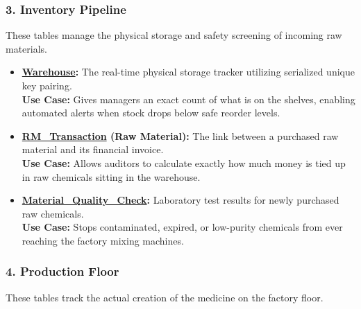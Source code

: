\documentclass[12pt, a4paper]{article}
\begin{document}
\subsubsection*{3. Inventory Pipeline}
These tables manage the physical storage and safety screening of incoming raw materials.

\begin{itemize}
    \item[$\rightarrow$] \textbf{\underline{Warehouse}:} The real-time physical storage tracker utilizing serialized unique key pairing.
    \\ \textbf{Use Case:} Gives managers an exact count of what is on the shelves, enabling automated alerts when stock drops below safe reorder levels.
    
    \item[$\rightarrow$] \textbf{\underline{RM\_Transaction} (Raw Material):} The link between a purchased raw material and its financial invoice.
    \\ \textbf{Use Case:} Allows auditors to calculate exactly how much money is tied up in raw chemicals sitting in the warehouse.

    \item[$\rightarrow$] \textbf{\underline{Material\_Quality\_Check}:} Laboratory test results for newly purchased raw chemicals.
    \\ \textbf{Use Case:} Stops contaminated, expired, or low-purity chemicals from ever reaching the factory mixing machines.
\end{itemize}

\subsubsection*{4. Production Floor}
These tables track the actual creation of the medicine on the factory floor.
\end{document}
